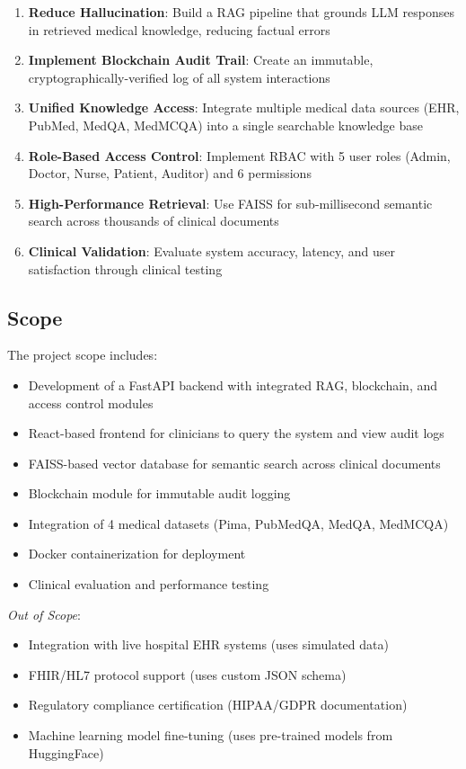 \documentclass[12pt,singleside,a4paper]{article}
\begin{document}
\begin{enumerate}
\item \textbf{Reduce Hallucination}: Build a RAG pipeline that grounds LLM responses in retrieved medical knowledge, reducing factual errors
\item \textbf{Implement Blockchain Audit Trail}: Create an immutable, cryptographically-verified log of all system interactions
\item \textbf{Unified Knowledge Access}: Integrate multiple medical data sources (EHR, PubMed, MedQA, MedMCQA) into a single searchable knowledge base
\item \textbf{Role-Based Access Control}: Implement RBAC with 5 user roles (Admin, Doctor, Nurse, Patient, Auditor) and 6 permissions
\item \textbf{High-Performance Retrieval}: Use FAISS for sub-millisecond semantic search across thousands of clinical documents
\item \textbf{Clinical Validation}: Evaluate system accuracy, latency, and user satisfaction through clinical testing
\end{enumerate}

\subsection{Scope}

The project scope includes:

\begin{itemize}
\item Development of a FastAPI backend with integrated RAG, blockchain, and access control modules
\item React-based frontend for clinicians to query the system and view audit logs
\item FAISS-based vector database for semantic search across clinical documents
\item Blockchain module for immutable audit logging
\item Integration of 4 medical datasets (Pima, PubMedQA, MedQA, MedMCQA)
\item Docker containerization for deployment
\item Clinical evaluation and performance testing
\end{itemize}

\textit{Out of Scope}:
\begin{itemize}
\item Integration with live hospital EHR systems (uses simulated data)
\item FHIR/HL7 protocol support (uses custom JSON schema)
\item Regulatory compliance certification (HIPAA/GDPR documentation)
\item Machine learning model fine-tuning (uses pre-trained models from HuggingFace)
\end{itemize}
\end{document}
